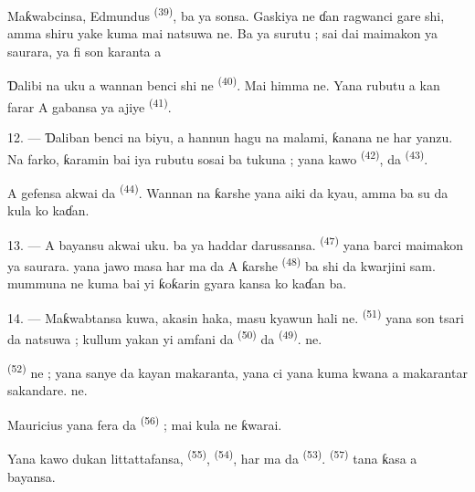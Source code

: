 Maƙwabcinsa, Edmundus \textsuperscript{(39)}, ba ya sonsa. Gaskiya ne
ɗan ragwanci gare shi, amma shiru yake kuma mai natsuwa ne. Ba ya
surutu ; sai dai maimakon ya saurara, ya fi son karanta
 a 

Ɗalibi na uku a wannan benci shi ne 
\textsuperscript{(40)}. Mai himma ne. Yana rubutu a kan farar
 A gabansa ya ajiye  \textsuperscript{(41)}.

12. --- Ɗaliban benci na biyu, a hannun hagu na malami, ƙanana ne har
yanzu. Na farko, ƙaramin  bai iya rubutu sosai ba
tukuna ; yana kawo  \textsuperscript{(42)},
 da 
\textsuperscript{(43)}.

A gefensa akwai  da 
\textsuperscript{(44)}. Wannan na ƙarshe yana aiki da kyau, amma
 ba su da kula ko kaɗan.

13. --- A bayansu akwai  uku.  ba ya
haddar darussansa.  \textsuperscript{(47)} yana barci
maimakon ya saurara.  yana jawo masa
 har ma da  A ƙarshe
 \textsuperscript{(48)} ba shi da kwarjini sam.
 mummuna ne kuma bai yi ƙoƙarin gyara kansa ko kaɗan
ba.

14. --- Maƙwabtansa kuwa, akasin haka, masu kyawun hali ne.
 \textsuperscript{(51)} yana son tsari da natsuwa ;
kullum yakan yi amfani da  \textsuperscript{(50)} da
 \textsuperscript{(49)}.  ne.

 \textsuperscript{(52)}  ne ;
yana sanye da kayan makaranta, yana ci yana kuma kwana a makarantar
sakandare.  ne.

Mauricius yana fera  da 
\textsuperscript{(56)} ; mai kula ne ƙwarai.

Yana kawo dukan littattafansa, 
\textsuperscript{(55)}, 
\textsuperscript{(54)}, har ma da 
\textsuperscript{(53)}. 
\textsuperscript{(57)} tana ƙasa a bayansa.

